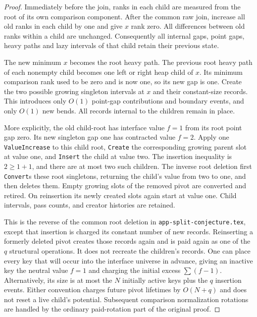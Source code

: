 \documentclass[11pt]{article}
\numberwithin{equation}{section}
\begin{document}
\begin{proof}
Immediately before the join, ranks in each child are measured from
the root of its own comparison component. After the common raw join,
increase all old ranks in each child by one and give $x$ rank zero.
All differences between old ranks within a child are unchanged.
Consequently all internal gaps, point gaps, heavy paths and lazy
intervals of that child retain their previous state.

The new minimum $x$ becomes the root heavy path. The previous root
heavy path of each nonempty child becomes one left or right heap child
of $x$. Its minimum comparison rank used to be zero and is now one,
so its new gap is one. Create the two possible growing singleton
intervals at $x$ and their constant-size records. This introduces only
$O(1)$ point-gap contributions and boundary events, and only $O(1)$
new bends. All records internal to the children remain in place.

More explicitly, the old child-root has interface value $f=1$ from
its root point gap zero. Its new singleton gap one has contracted
value $f=2$. Apply one \texttt{ValueIncrease} to this child root,
\texttt{Create} the corresponding growing parent slot at value one,
and \texttt{Insert} the child at value two. The insertion inequality
is $2\ge1+1$, and there are at most two such children. The inverse
root deletion first \texttt{Convert}s these root singletons, returning
the child's value from two to one, and then deletes them. Empty
growing slots of the removed pivot are converted and retired. On
reinsertion its newly created slots again start at value one.
Child intervals, pass counts, and creator histories are retained.

This is the reverse of the common root deletion in
\texttt{app-split-conjecture.tex}, except that insertion is charged its
constant number of new records. Reinserting a formerly deleted pivot
creates those records again and is paid again as one of the $q$
structural operations. It does not recreate the children's records.
One can place every key that will occur into the interface universe
in advance, giving an inactive key the neutral value $f=1$ and
charging the initial excess $\sum(f-1)$. Alternatively, its size is
at most the $N$ initially active keys plus the $q$ insertion events.
Either convention charges future pivot lifetimes by $O(N+q)$ and
does not reset a live child's potential.
Subsequent comparison normalization rotations are handled by the
ordinary paid-rotation part of the original proof.
\end{proof}
\end{document}
